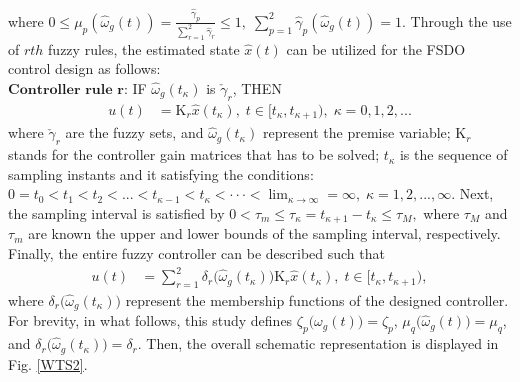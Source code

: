 \documentclass[preprint,11pt]{elsarticle}
\begin{document}
where
$
0\leq\mu_p(\hat{\omega}_g(t))=\frac{\hat{\gamma}_p}{\sum^2_{r=1}\hat{\gamma}_r}\leq 1,\;\sum^2_{p=1}\hat{\gamma}_p(\hat{\omega}_g(t))=1.
$
Through the use of $rth$ fuzzy rules, the estimated state $\hat{x}(t)$ can be utilized for the FSDO control design as follows:\\
$\textbf{Controller rule r:}$ {IF} $\hat{\omega}_g(t_\kappa)$ is $\check{\gamma}_{r}$, {THEN}
\begin{align}\label{10}
u(t)&=\mathrm{K}_r \hat{x}(t_\kappa),\;t\in[t_\kappa,t_{\kappa+1}),\;\kappa=0,1,2,...
\end{align}
where $\check{\gamma}_{r}$ are the fuzzy sets, and $\hat{\omega}_g(t_\kappa)$ represent the premise variable; $\mathrm{K}_r$ stands for the controller gain matrices that has to be solved; $t_\kappa$ is the sequence of sampling instants and it satisfying the conditions: $0=t_{0}<t_{1}<t_{2}<...<t_{\kappa-1}< t_\kappa<\cdot\cdot\cdot<\lim_{\kappa\rightarrow \infty}=\infty,\;\kappa=1,2,...,\infty$. Next, the sampling interval is satisfied by
$
0<\tau_m\leq \tau_{\kappa}=t_{\kappa+1}-t_{\kappa}\leq \tau_M,
$
where $\tau_M$ and $\tau_m$ are known the upper and lower bounds of the sampling interval, respectively. Finally, the entire fuzzy controller can be described such that
\begin{align}\label{11}
u(t)&=\sum^{2}_{r=1}\delta_r\big( \hat{\omega}_g(t_\kappa) \big)\mathrm{K}_r \hat{x}(t_\kappa),\;t\in[t_\kappa,t_{\kappa+1}),
\end{align}
where $\delta_r\big( \hat{\omega}_g(t_\kappa) \big)$ represent the membership functions of the designed controller. For brevity, in what follows, this study defines $\zeta_p\big( \omega_g(t) \big)=\zeta_p$, $\mu_q\big( \hat{\omega}_g(t) \big)=\mu_q$, and $\delta_r\big( \hat{\omega}_g(t_\kappa) \big)=\delta_r$.
Then, the overall schematic representation is displayed in Fig. \ref{WTS2}.
\vspace{-0.2cm}
\end{document}
